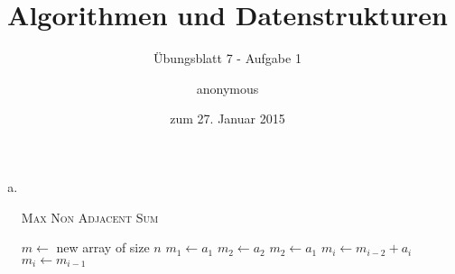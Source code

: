 \documentclass[a4paper]{scrartcl}
\title{Algorithmen und Datenstrukturen}
\subtitle{Übungsblatt 7 - Aufgabe 1}
\author{
    anonymous
}
\date{zum 27. Januar 2015}
\begin{document}
\maketitle

\begin{enumerate}[(a)]
    \item \hfill \\
        \begin{algorithm}
            \caption{\textsc{Max Non Adjacent Sum}}
            \label{alg:1}
            \begin{algorithmic}[1]
                \State $m \gets$ new array of size $n$
                \State $m_1 \gets a_1$
                    \State $m_2 \gets a_2$
                \Else
                    \State $m_2 \gets a_1$
                \EndIf
                        \State $m_i \gets m_{i-2} + a_i$
                    \Else
                        \State $m_i \gets m_{i-1}$
                    \EndIf
                \EndFor
                \State {}
                \EndProcedure
            \end{algorithmic}
        \end{algorithm}

\end{enumerate}
\end{document}
